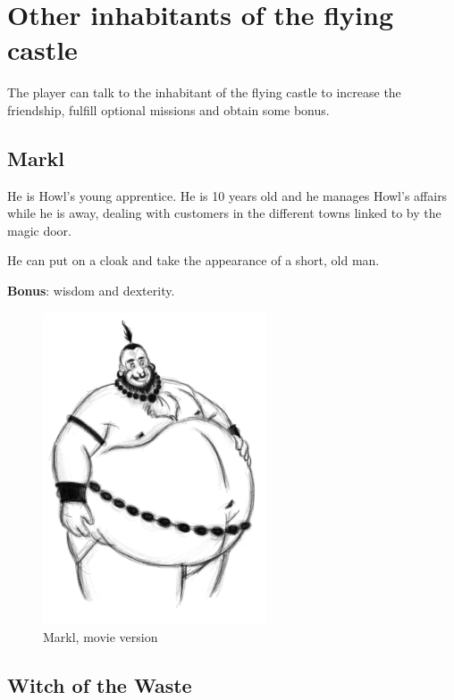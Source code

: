 \section{Other inhabitants of the flying castle}

The player can talk to the inhabitant of the flying castle to increase the friendship, fulfill optional missions and obtain some bonus.

\subsection{Markl}

\begin{minipage}{0.5\textwidth}
He is Howl’s young apprentice. He is 10 years old and he manages Howl's affairs while he is away, dealing with customers in the different towns linked to by the magic door.

He can put on a cloak and take the appearance of a short, old man.

\textbf{Bonus}: wisdom and dexterity.\\

\end{minipage}%
%
\hfill\begin{minipage}{0.4\textwidth}
  \begin{figure}[H]
    \hfill\includegraphics{Images/Characters/belzel}
    \caption{Markl, movie version}
  \end{figure}
\end{minipage}

\subsection{Witch of the Waste}

